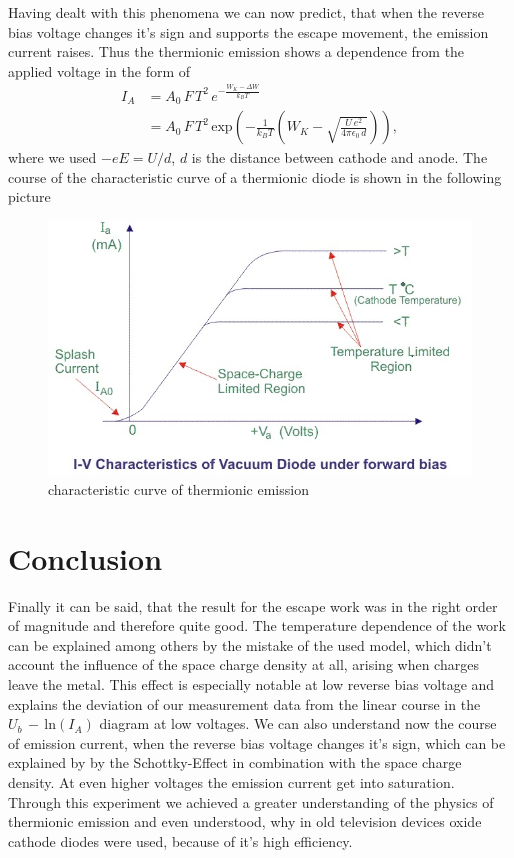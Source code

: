 \documentclass[a4paper, 12pt]{scrartcl}
\begin{document}
Having dealt with this phenomena we can now predict, that when the reverse bias voltage changes it's sign and supports the escape movement, the emission current raises.
Thus the thermionic emission shows a dependence from the applied voltage in the form of
\begin{align*}I_A&=A_0\,F\,T^2\,e^{-\frac{W_K-\Delta{W}}{k_BT}}\\
&=A_0\,F\,T^2\,\text{exp}\left(-\frac{1}{k_BT}\left(W_K-\sqrt{\frac{U\,e^2}{4\pi\epsilon_0\,d}}\right)\right),\end{align*}
where we used $-eE=U/d$, $d$ is the distance between cathode and anode. The course of the characteristic curve of a thermionic diode is shown in the following picture
\begin{figure}[H]\includegraphics[scale=0.8]{Kennlinie thermische emission}\caption{characteristic curve of thermionic emission}\end{figure}

\section{Conclusion}
Finally it can be said, that the result for the escape work was in the right order of magnitude and therefore quite good. The temperature dependence of the work can  be explained  among others by the mistake of the used model, which didn't account the influence of the space charge density at all, arising when charges leave the metal. This effect is especially notable at low reverse bias voltage and explains the deviation of our measurement data from the linear course in the $U_b\,-\,\text{ln}(I_A)$ diagram at low voltages. We can also understand now the course of emission current, when the reverse bias voltage changes it's sign, which can be explained by by the Schottky-Effect in combination with the space charge density. At even higher voltages the emission current get into saturation. 
Through this experiment we achieved a greater understanding of the physics of thermionic emission and even understood, why in old television devices oxide cathode  diodes were used, because of it's high efficiency.
\end{document}
